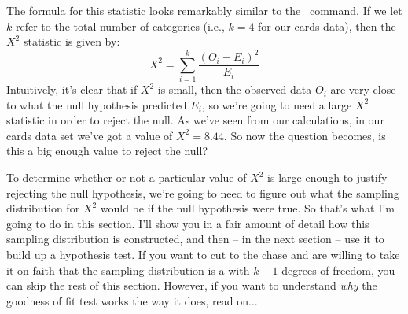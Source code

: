 The formula for this statistic looks remarkably similar to the \R\ command. If we let $k$ refer to the total number of categories (i.e., $k=4$ for our cards data), then the $X^2$ statistic is given by:
$$
X^2 = \sum_{i=1}^k \frac{(O_i - E_i)^2}{E_i}
$$ 
Intuitively, it's clear that if $X^2$ is small, then the observed data $O_i$ are very close to what the null hypothesis predicted $E_i$, so we're going to need a large $X^2$ statistic in order to reject the null. As we've seen from our calculations, in our cards data set we've got a value of $X^2 = 8.44$. So now the question becomes, is this a big enough value to reject the null?


To determine whether or not a particular value of $X^2$ is large enough to justify rejecting the null hypothesis, we're going to need to figure out what the sampling distribution for $X^2$ would be if the null hypothesis were true. So that's what I'm going to do in this section. I'll show you in a fair amount of detail how this sampling distribution is constructed, and then -- in the next section -- use it to build up a hypothesis test. If you want to cut to the chase and are willing to take it on faith that the sampling distribution is a  with $k-1$ degrees of freedom, you can skip the rest of this section. However, if you want to understand {\it why} the goodness of fit test works the way it does, read on...

